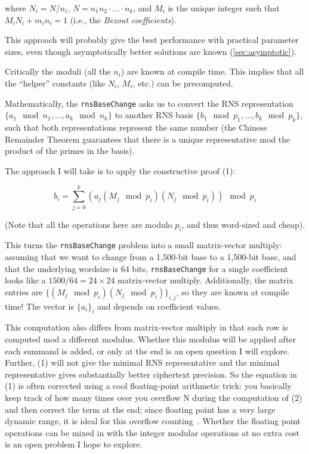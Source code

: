 where $N_i = N/n_i$, $N=n_1n_2\cdot...\cdot n_k$, and $M_i$ is the unique integer
such that $M_iN_i + m_in_i = 1$ (i.e., the \emph{Bezout coefficients}).

This approach will probably give the best performance with practical parameter
sizes, even though asymptotically better solutions are known (\autoref{sec:asymptotic}).

Critically the moduli (all the $n_i$) are known at compile time. This implies
that all the “helper” constants (like $N_i$, $M_i$, etc.) can be precomputed.

Mathematically, the \verb!rnsBaseChange! asks us to convert the RNS representation
$\{a_1 \mod n_1, …, a_k \mod n_k\}$ to another RNS basis $\{b_1 \mod p_1, …, b_k
\mod p_k\}$, such that both representations represent the same number (the
Chinese Remainder Theorem guarantees that there is a unique representative mod
the product of the primes in the basis).

The approach I will take is to apply the constructive proof (1):

\begin{equation*}
b_i = \sum_{j=0}^k (a_j (M_j \mod p_i) (N_j \mod p_i)) \mod p_i
\end{equation*}

(Note that all the operations here are modulo $p_i$, and thus word-sized and
cheap).

This turns the \verb!rnsBaseChange! problem into a small matrix-vector multiply:
assuming that we want to change from a 1,500-bit base to a 1,500-bit base, and
that the underlying wordsize is 64 bits, \verb!rnsBaseChange! for a single coefficient
looks like a $1500/64=24\times 24$ matrix-vector multiply.
Additionally, the matrix entries are $\{(M_j \mod p_i) (N_j \mod p_i)\}_{i,
j}$, so they are known at compile time!
The vector is $\{a_i\}_i$ and depends on coefficient values.

This computation also differs from matrix-vector multiply in that each row is
computed mod a different modulus.
Whether this modulus will be applied after each summand is added, or only at
the end is an open question I will explore.
Further, (1) will not give the minimal RNS representative and the minimal
representative gives substantially better ciphertext precision\cite{bajard2017full}.
So the equation in (1) is often corrected using a cool floating-point
arithmetic trick: you basically keep track of how many times over you overflow
N during the computation of (2) and then correct the term at the end; since
floating point has a very large dynamic range, it is ideal for this overflow
counting~\cite{lattigo-github}.
Whether the floating point operations can be mixed in with the integer modular
operations at no extra cost is an open problem I hope to explore.


